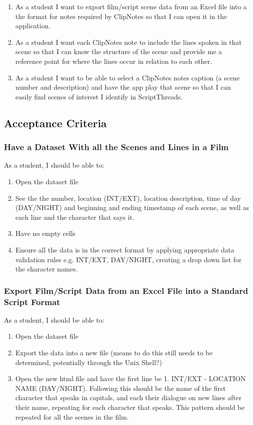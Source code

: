 \documentclass{article}
\begin{document}
\begin{enumerate}
    \item As a student I want to export film/script scene data from an Excel file into a the format for notes required by ClipNotes so that I can open it in the application.
    \item As a student I want each ClipNotes note to include the lines spoken in that scene so that I can know the structure of the scene and provide me a reference point for where the lines occur in relation to each other.
    \item As a student I want to be able to select a ClipNotes notes caption (a scene number and description) and have the app play that scene so that I can easily find scenes of interest I identify in ScriptThreads.
\end{enumerate}

\subsection{Acceptance Criteria}
\subsubsection{Have a Dataset With all the Scenes and Lines in a Film}
As a student, I should be able to:
\begin{enumerate}
    \item Open the dataset file
    \item See the the number, location (INT/EXT), location description, time of day (DAY/NIGHT) and beginning and ending timestamp of each scene, as well as each line and the character that says it.
    \item Have no empty cells
    \item Ensure all the data is in the correct format by applying appropriate data validation rules e.g. INT/EXT, DAY/NIGHT, creating a drop down list for the character names.
\end{enumerate}

\subsubsection{Export Film/Script Data from an Excel File into a Standard Script Format}
As a student, I should be able to:
\begin{enumerate}
    \item Open the dataset file
    \item Export the data into a new file (means to do this still needs to be determined, potentially through the Unix Shell?)
    \item Open the new html file and have the first line be 1. INT/EXT - LOCATION NAME (DAY/NIGHT). Following this should be the name of the first character that speaks in capitals, and each their dialogue on new lines after their name, repeating for each character that speaks. This pattern should be repeated for all the scenes in the film.
\end{enumerate}
\end{document}
